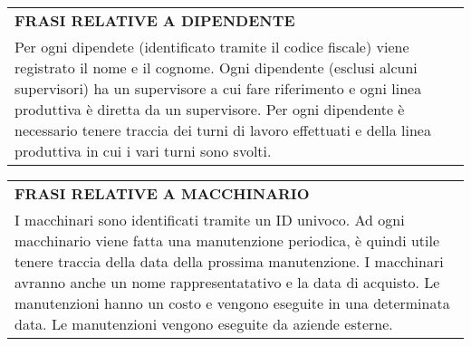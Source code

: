 \begin{center}
	\vspace{0.5cm}

	\begin{tabular}{P{16cm}}
		\toprule
		 \textbf {\large {FRASI RELATIVE A DIPENDENTE}}                                                                                                                                                                                                                                                                                                   \\
		Per ogni dipendete (identificato tramite il codice fiscale) viene registrato il nome e il cognome. Ogni dipendente (esclusi alcuni supervisori) ha un supervisore a cui fare riferimento e ogni linea produttiva è diretta da un supervisore. Per ogni dipendente è necessario tenere traccia dei turni di lavoro effettuati e della linea produttiva in cui i vari turni sono svolti. \\
		\bottomrule
	\end{tabular}

	\vspace{0.5cm}

	\begin{tabular}{P{16cm}}
		\toprule
		 \textbf {\large {FRASI RELATIVE A MACCHINARIO}}                                                                                                                                                                                    \\
		I macchinari sono identificati tramite un ID univoco. Ad ogni macchinario viene fatta una manutenzione periodica, è quindi utile tenere traccia della data della prossima manutenzione. I macchinari avranno anche un nome rappresentatativo e la data di acquisto.
		Le manutenzioni hanno un costo e vengono eseguite in una determinata data. Le manutenzioni vengono eseguite da aziende esterne.                                                                                                                                     \\
		\bottomrule
	\end{tabular}

\end{center}